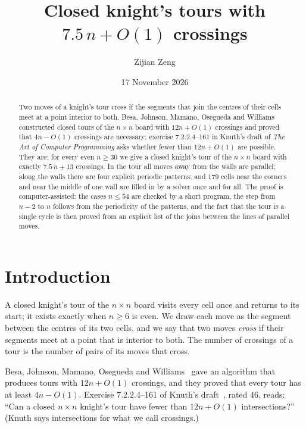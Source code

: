 \documentclass[11pt]{amsart}
\theoremstyle{remark}
\begin{document}
\title[Knight's tours with $7.5n+O(1)$ crossings]{Closed knight's tours with $7.5\,n+O(1)$ crossings}
\author{Zijian Zeng}
\address{UCSI University, Kuala Lumpur, Malaysia}
\date{17 November 2026}

\begin{abstract}
Two moves of a knight's tour cross if the segments that join the centres of their cells meet at a point interior to
both. Besa, Johnson, Mamano, Osegueda and Williams constructed closed tours of the $n\times n$ board with
$12n+O(1)$ crossings and proved that $4n-O(1)$ crossings are necessary; exercise 7.2.2.4--161 in Knuth's draft of
\emph{The Art of Computer Programming} asks whether fewer than $12n+O(1)$ are possible. They are: for every even
$n\ge30$ we give a closed knight's tour of the $n\times n$ board with exactly $7.5\,n+13$ crossings. In the tour all
moves away from the walls are parallel; along the walls there are four explicit periodic patterns; and $179$ cells
near the corners and near the middle of one wall are filled in by a solver once and for all. The proof is
computer-assisted: the cases $n\le54$ are checked by a short program, the step from $n-2$ to $n$ follows from the
periodicity of the patterns, and the fact that the tour is a single cycle is then proved from an explicit list of the
joins between the lines of parallel moves.
\end{abstract}
\maketitle

\section{Introduction}
A closed knight's tour of the $n\times n$ board visits every cell once and returns to its start; it exists exactly
when $n\ge6$ is even. We draw each move as the segment between the centres of its two cells, and we say that two
moves \emph{cross} if their segments meet at a point that is interior to both. The number of crossings of a tour is
the number of pairs of its moves that cross.

Besa, Johnson, Mamano, Osegueda and Williams~\cite{besa} gave an algorithm that produces tours with $12n+O(1)$
crossings, and they proved that every tour has at least $4n-O(1)$. Exercise 7.2.2.4--161 of Knuth's
draft~\cite{knuth}, rated $46$, reads: ``Can a closed $n\times n$ knight's tour have fewer than $12n+O(1)$
intersections?'' (Knuth says intersections for what we call crossings.)
\end{document}
